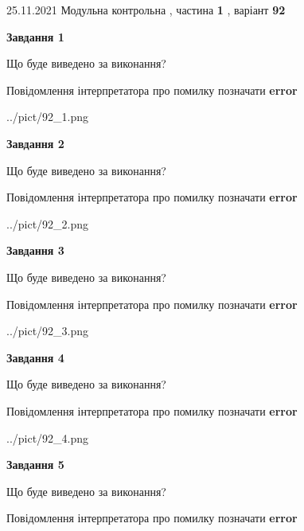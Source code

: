 \documentclass[10pt, ukrainian]{article}
\begin{document}
{25.11.2021 Модульна контрольна , частина \textbf { 1 }, варіант  \No \textbf { 92 }\par}
{
\begin {large}

{\begin {center}\textbf{Завдання 1}\end {center}}\par
Що буде виведено за виконання? \par
Повідомлення інтерпретатора про помилку позначати \textbf{error}

\begin{center}
	{../pict/92_1.png}
\end{center}
\newpage

{\begin {center}\textbf{Завдання 2}\end {center}}\par
Що буде виведено за виконання? \par
Повідомлення інтерпретатора про помилку позначати \textbf{error}

\begin{center}
	{../pict/92_2.png}
\end{center}
\newpage

{\begin {center}\textbf{Завдання 3}\end {center}}\par
Що буде виведено за виконання? \par
Повідомлення інтерпретатора про помилку позначати \textbf{error}

\begin{center}
	{../pict/92_3.png}
\end{center}
\newpage

{\begin {center}\textbf{Завдання 4}\end {center}}\par
Що буде виведено за виконання? \par
Повідомлення інтерпретатора про помилку позначати \textbf{error}

\begin{center}
	{../pict/92_4.png}
\end{center}
\newpage

{\begin {center}\textbf{Завдання 5}\end {center}}\par
Що буде виведено за виконання? \par
Повідомлення інтерпретатора про помилку позначати \textbf{error}


\end{large}}
\end{document}
